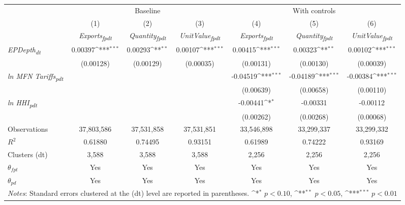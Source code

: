 {
\def\sym#1{\ifmmode^{#1}\else\(^{#1}\)\fi}
\begin{tabular}{l*{6}{c}}
\toprule
&\multicolumn{3}{c}{Baseline}&\multicolumn{3}{c}{With controls}\\\cmidrule(lr){2-4}\cmidrule(lr){5-7}
&(1)&(2)&(3)&(4)&(5)&(6)\\
&\textit{Exports\textsubscript{fpdt}}&\textit{Quantity\textsubscript{fpdt}}&\textit{UnitValue\textsubscript{fpdt}}&\textit{Exports\textsubscript{fpdt}}&\textit{Quantity\textsubscript{fpdt}}&\textit{UnitValue\textsubscript{fpdt}}\\
\midrule
\textit{EPDepth\textsubscript{dt}} & 0.00397\sym{***} & 0.00293\sym{**} & 0.00107\sym{***} & 0.00415\sym{***} & 0.00323\sym{**} & 0.00102\sym{***}\\
 & (0.00128) & (0.00129) & (0.00035) & (0.00131) & (0.00130) & (0.00039)\\
\addlinespace
\textit{ln MFN Tariffs\textsubscript{pdt}} &  &  &  & -0.04519\sym{***} & -0.04189\sym{***} & -0.00384\sym{***}\\
 &  &  &  & (0.00639) & (0.00658) & (0.00110)\\
\addlinespace
\textit{ln HHI\textsubscript{pdt}} &  &  &  & -0.00441\sym{*} & -0.00331 & -0.00112\\
 &  &  &  & (0.00262) & (0.00268) & (0.00068)\\
\midrule
Observations & 37,803,586 & 37,531,858 & 37,531,851 & 33,546,898 & 33,299,337 & 33,299,332\\
$R^{2}$ & 0.61880 & 0.74495 & 0.93151 & 0.61989 & 0.74222 & 0.93169\\
Clusters (dt) & 3,588 & 3,588 & 3,588 & 2,256 & 2,256 & 2,256\\
$\theta_{fpt}$ & Yes & Yes & Yes & Yes & Yes & Yes\\
$\theta_{pd}$ & Yes & Yes & Yes & Yes & Yes & Yes\\
\bottomrule
\multicolumn{7}{l}{\footnotesize \textit{Notes}: Standard errors clustered at the (dt) level are reported in parentheses. \sym{*} \(p<0.10\), \sym{**} \(p<0.05\), \sym{***} \(p<0.01\)}\\
\end{tabular}
}
